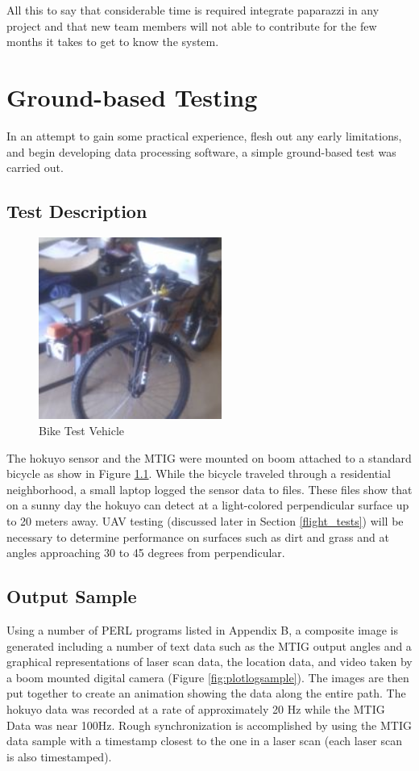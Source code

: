 \documentclass[a4paper,11pt]{report}
\begin{document}
All this to say that considerable time is required integrate paparazzi in any project and that new team members will not able to contribute for the few months it takes to get to know the system.

\chapter{Ground-based Testing}

In an attempt to gain some practical experience, flesh out any early limitations, and begin developing data processing software, a simple ground-based test was carried out.

\section{Test Description}

\begin{figure}[ht]
 \centering
 \includegraphics[width=6cm]{Bikesciencepackage.jpg}
 \caption{Bike Test Vehicle}
 \label{fig:bike}
\end{figure}

The hokuyo sensor and the MTIG were mounted on boom attached to a standard bicycle as show in Figure \ref{fig:bike}. While the bicycle traveled through a residential neighborhood, a small laptop logged the sensor data to files. These files show that on a sunny day the hokuyo can detect at a light-colored perpendicular surface up to 20 meters away. UAV testing (discussed later in Section \ref{flight_tests}) will be necessary to determine performance on surfaces such as dirt and grass and at angles approaching 30 to 45 degrees from perpendicular.

\section{Output Sample}

Using a number of PERL programs listed in Appendix B, a composite image is generated including a number of text data such as the MTIG output angles and a graphical representations of laser scan data, the location data, and video taken by a boom mounted digital camera (Figure \ref{fig:plotlogsample}). The images are then put together to create an animation showing the data along the entire path. The hokuyo data was recorded at a rate of approximately 20 Hz while the MTIG Data was near 100Hz. Rough synchronization is accomplished by using the MTIG data sample with a timestamp closest to the one in a laser scan (each laser scan is also timestamped). 
\end{document}
